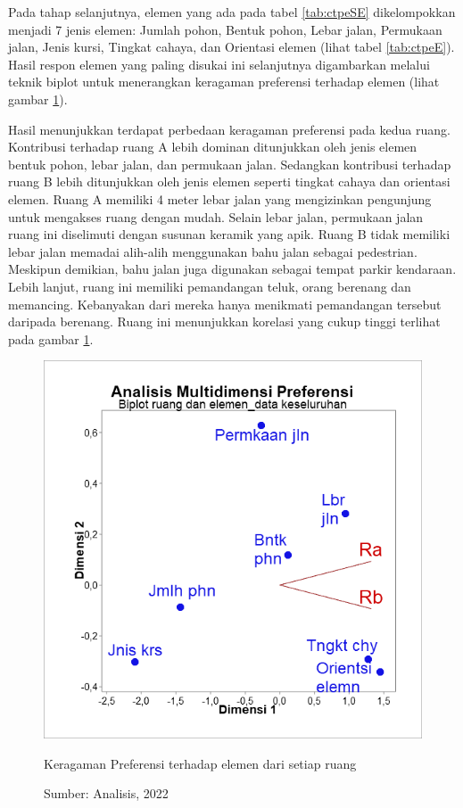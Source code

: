 \documentclass[11pt]{udthesis} %
\begin{document}
Pada tahap selanjutnya, elemen yang ada pada tabel \ref{tab:ctpeSE} dikelompokkan menjadi 7 jenis elemen: Jumlah pohon, Bentuk pohon, Lebar jalan, Permukaan jalan, Jenis kursi, Tingkat cahaya, dan Orientasi elemen (lihat tabel \ref{tab:ctpeE}). Hasil respon elemen yang paling disukai ini selanjutnya digambarkan melalui teknik biplot untuk menerangkan keragaman preferensi terhadap elemen (lihat gambar \ref{fig:bre}).

Hasil menunjukkan terdapat perbedaan keragaman preferensi pada kedua ruang. Kontribusi terhadap ruang A lebih dominan ditunjukkan oleh jenis elemen bentuk pohon, lebar jalan, dan permukaan jalan. Sedangkan kontribusi terhadap ruang B lebih ditunjukkan oleh jenis elemen seperti tingkat cahaya dan orientasi elemen. Ruang A memiliki 4 meter lebar jalan yang mengizinkan pengunjung untuk mengakses ruang dengan mudah. Selain lebar jalan, permukaan jalan ruang ini diselimuti dengan susunan keramik yang apik. Ruang B tidak memiliki lebar jalan memadai alih-alih menggunakan bahu jalan sebagai pedestrian. Meskipun demikian, bahu jalan juga digunakan sebagai tempat parkir kendaraan. Lebih lanjut, ruang ini memiliki pemandangan teluk, orang berenang dan memancing. Kebanyakan dari mereka hanya menikmati pemandangan tersebut daripada berenang. Ruang ini menunjukkan korelasi yang cukup tinggi terlihat pada gambar \ref{fig:bre}.

\begin{figure}[htpb]
    \centering
    \includegraphics[width=\textwidth,trim={.5cm .3cm .5cm .1cm},clip]{figures/bre.png}
    \caption{Keragaman Preferensi terhadap elemen dari setiap ruang}
    \caption*{Sumber: Analisis, 2022}
    \label{fig:bre}
\end{figure}
\end{document}

